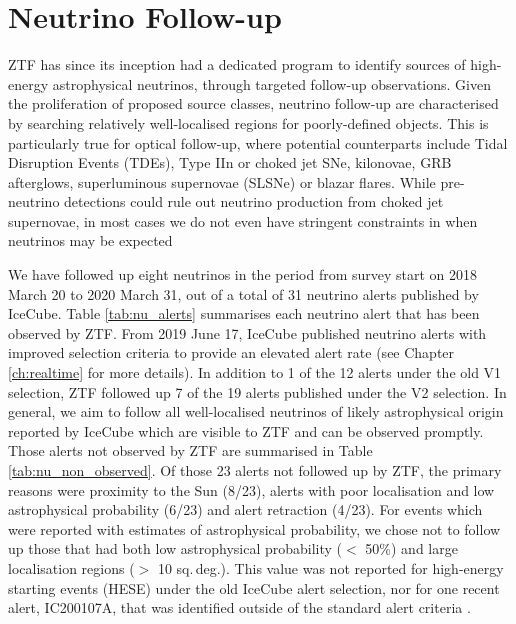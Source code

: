 \section{Neutrino Follow-up}
ZTF has since its inception had a dedicated program to identify sources of high-energy astrophysical neutrinos, through targeted follow-up observations. Given the proliferation of proposed source classes, neutrino follow-up are characterised by searching relatively well-localised regions for poorly-defined objects. This is particularly true for optical follow-up, where potential counterparts include Tidal Disruption Events (TDEs), Type IIn or choked jet SNe, kilonovae, GRB afterglows, superluminous supernovae (SLSNe) or blazar flares. While pre-neutrino detections could rule out neutrino production from choked jet supernovae, in most cases we do not even have stringent constraints in when neutrinos may be expected 

 We have followed up eight neutrinos in the period from survey start on 2018 March 20 to 2020 March 31, out of a total of 31 neutrino alerts published by IceCube. Table \ref{tab:nu_alerts} summarises each neutrino alert that has been observed by ZTF. From 2019 June 17, IceCube published neutrino alerts with improved selection criteria to provide an elevated alert rate  (see Chapter \ref{ch:realtime} for more details). In addition to 1 of the 12 alerts under the old V1 selection, ZTF followed up 7 of the 19 alerts published under the V2 selection. In general, we aim to follow all well-localised neutrinos of likely astrophysical origin reported by IceCube which are visible to ZTF and can be observed promptly. Those alerts not observed by ZTF are summarised in Table \ref{tab:nu_non_observed}. Of those 23 alerts not followed up by ZTF, the primary reasons were proximity to the Sun (8/23), alerts with poor localisation and low astrophysical probability (6/23) and alert retraction (4/23). For events which were reported with estimates of astrophysical probability, we chose not to follow up those that had both low astrophysical probability ($<$ 50\%) and large localisation regions ($>$ 10 sq.\,deg.). This value was not reported for high-energy starting events (HESE) under the old IceCube alert selection, nor for one recent alert, IC200107A, that was identified outside of the standard alert criteria .

